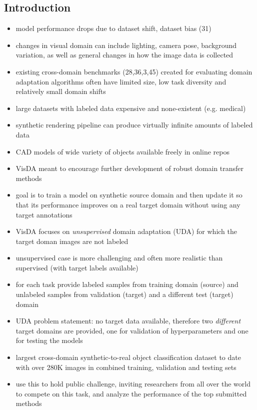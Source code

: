 \subsection{Introduction}
\begin{itemize}
	\item model performance drops due to dataset shift, dataset bias (31)
	\item changes in visual domain can include lighting, camera pose, background variation, as well as general changes in how the image data is collected
	\item existing cross-domain benchmarks (28,36,3,45) created for evaluating domain adaptation algorithms often have limited size, low task diversity and relatively small domain shifts
	\item large datasets with labeled data expensive and none-existent (e.g. medical)
	\item synthetic rendering pipeline can produce virtually infinite amounts of labeled data
	\item CAD models of wide variety of objects available freely in online repos
	\item VisDA meant to encourage further development of robust domain transfer methods
	\item goal is to train a model on synthetic source domain and then update it so that its performance improves on a real target domain without using any target annotations
	\item VisDA focuses on \textit{unsupervised} domain adaptation (UDA) for which the target doman images are not labeled
	\item unsupervised case is more challenging and often more realistic than supervised (with target labels available)
	\item for each task provide labeled samples from training domain (source) and unlabeled samples from validation (target) and a different test (target) domain
	\item UDA problem statement: no target data available, therefore two \textit{different} target domains are provided, one for validation of hyperparameters and one for testing the models
	\item largest cross-domain synthetic-to-real object classification dataset to date with over 280K images in combined training, validation and testing sets
	\item use this to hold public challenge, inviting researchers from all over the world to compete on this task, and analyze the performance of the top submitted methods
\end{itemize}

